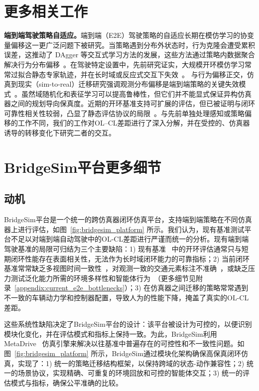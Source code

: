 \documentclass{article}
\begin{document}
\section{更多相关工作}
\label{appendix:more_related_works}
\textbf{端到端驾驶策略自适应。}端到端（E2E）驾驶策略的自适应长期在模仿学习的协变量偏移这一更广泛问题下被研究。当策略遇到分布外状态时，行为克隆会遭受累积误差，这推动了 DAgger 等交互式学习方法的发展，这些方法通过策略内数据聚合解决行为分布偏移~\cite{ross2011dagger, ross2014reinforcement}。在驾驶特定设置中，先前研究证实，大规模开环模仿学习常常过拟合静态专家轨迹，并在长时域或反应式交互下失效~\cite{codevilla2019exploring,zheng2024datascalinglaw}。
与行为偏移正交，仿真到现实（sim-to-real）迁移研究强调观测分布偏移是端到端策略的关键失效模式~\cite{dosovitskiy2017carla}。虽然域随机化和表征学习可以提高鲁棒性，但它们并不能显式保证异构仿真器之间的规划导向保真度。近期的开环基准支持可扩展的评估，但已被证明与闭环可靠性相关性较弱，凸显了静态评估协议的局限~\cite{navsimv1, navsimv2}。与先前单独处理感知或策略偏移的工作不同，我们的工作对OL–CL差距进行了深入分解，并在受控的、仿真器诱导的转移变化下研究二者的交互。

\section{BridgeSim平台更多细节}
\label{appendix:bridgesim_platform}

\subsection{动机}
BridgeSim平台是一个统一的跨仿真器闭环仿真平台，支持端到端策略在不同仿真器上进行评估，如图~\ref{fig:bridgesim_platform} 所示。我们认为，现有基准测试平台不足以对端到端自动驾驶中的OL-CL差距进行严谨而统一的分析。现有端到端驾驶基准的局限可归结为三个主要缺陷：1) 现有基准~\cite{navsimv1, navsimv2} 中的开环评估通常只与短期闭环性能存在表面相关性，无法作为长时域闭环能力的可靠指标；2) 当前闭环基准常常缺乏多视图时间一致性~\cite{yang2024drivearena}，对观测一致的交通元素标注不准确~\cite{zhou2024hugsim}，或缺乏压力测试泛化能力所需的环境多样性和智能体行为~\cite{jia2024bench}（更多细节见附录~\ref{appendix:current_e2e_bottlenecks}）；3) 在仿真器之间迁移的策略常常遇到不一致的车辆动力学和控制器配置，导致人为的性能下降，掩盖了真实的OL-CL差距。

这些系统性缺陷决定了BridgeSim平台的设计：该平台被设计为可控的，以便识别模块化变化，并在评估模式和指标上保持一致。为此，BridgeSim利用 MetaDrive~\cite{li2022metadrive, li2023scenarionet} 仿真引擎来解决以往基准中普遍存在的可控性和不一致性问题。如图~\ref{fig:bridgesim_platform} 所示，BridgeSim通过模块化架构确保高保真闭环仿真，实现了：1) 统一的策略迁移结构框架，以保持跨域的状态-动作兼容性；2) 统一的场景协议，实现精确、可重复的环境回放和可控的智能体交互；3) 统一的评估模式与指标，确保公平准确的比较。
\end{document}
